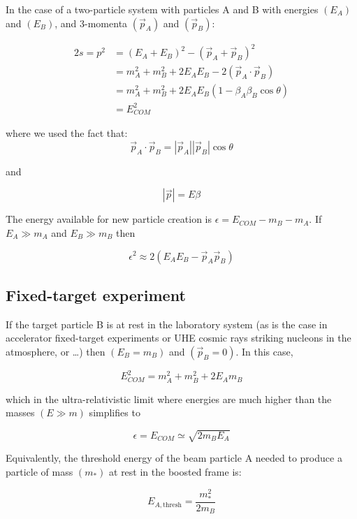 \documentclass[
  letterpaper,
  DIV=11,
  numbers=noendperiod]{scrreprt}
\begin{document}
In the case of a two-particle system with particles A and B with
energies \((E_A)\) and \((E_B)\), and 3-momenta \((\vec{p}_A)\) and
\((\vec{p}_B)\):

\[\begin{aligned}{2}
s = p^2 &= (E_A + E_B)^2 - (\vec{p}_A + \vec{p}_B)^2 \\
    &= m_A^2 + m_B^2 + 2E_AE_B - 2(\vec{p}_A \cdot \vec{p}_B)\\
    &= m_A^2 + m_B^2 + 2E_AE_B( 1 - \beta_A\beta_B\cos \theta)\\
    &= E_{COM}^2
\end{aligned}\]

where we used the fact that:
\[\vec{p}_A \cdot \vec{p}_B = |\vec{p}_A ||\vec{p}_B|\cos\theta\]

and

\[ |\vec{p}| = E\beta \]

The energy available for new particle creation is
\(\epsilon = E_{COM} - m_B - m_A\). If \(E_A \gg m_A\) and
\(E_B \gg m_B\) then

\[\epsilon^2 \approx 2 (E_A E_B - \vec{p}_A \vec{p}_B )\]

\subsection*{Fixed-target experiment}\label{fixed-target-experiment}

If the target particle B is at rest in the laboratory system (as is the
case in accelerator fixed-target experiments or UHE cosmic rays striking
nucleons in the atmosphere, or \ldots) then \((E_B = m_B)\) and
\((\vec{p}_B = 0)\). In this case,

\[E_{COM}^2 = m_A^2 + m_B^2 + 2E_Am_B
\]

which in the ultra-relativistic limit where energies are much higher
than the masses \((E \gg m)\) simplifies to

\[\epsilon = E_{COM} \simeq \sqrt{2m_BE_A}\]

Equivalently, the threshold energy of the beam particle A needed to
produce a particle of mass \((m_*)\) at rest in the boosted frame is:

\[E_{A,\mathrm{thresh}} = \frac{m_*^2}{2m_B}\]
\end{document}
